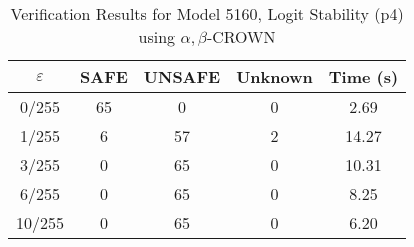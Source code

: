 \begin{table}[htbp]
\centering
\caption{Verification Results for Model 5160, Logit Stability (p4) using $\alpha,\beta$-CROWN}
\label{tab:model5160_p4_abcrown}
\begin{tabular}{|c|c|c|c|c|}
\hline
$\varepsilon$ & SAFE & UNSAFE & Unknown & Time (s) \\ \hline
0/255 & 65 & 0 & 0 & 2.69 \\ \hline
1/255 & 6 & 57 & 2 & 14.27 \\ \hline
3/255 & 0 & 65 & 0 & 10.31 \\ \hline
6/255 & 0 & 65 & 0 & 8.25 \\ \hline
10/255 & 0 & 65 & 0 & 6.20 \\ \hline
\end{tabular}
\end{table}
